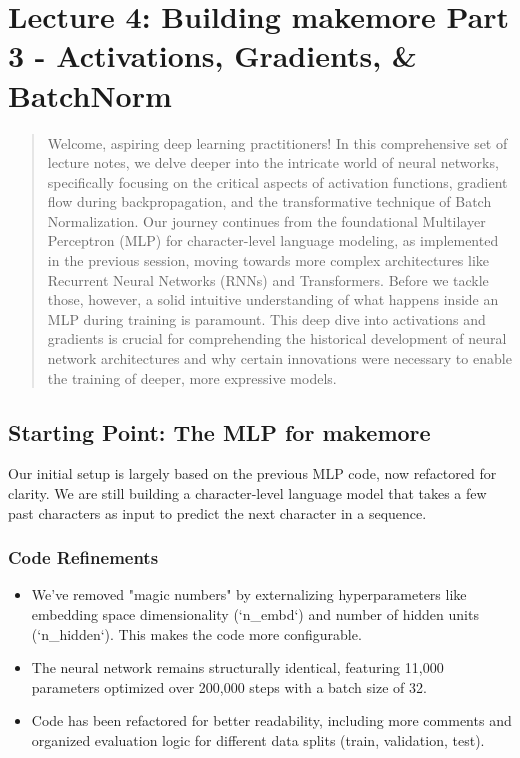 
\section{Lecture 4: Building makemore Part 3 - Activations, Gradients, \& BatchNorm}

\begin{abstract}
Welcome, aspiring deep learning practitioners! In this comprehensive set of lecture notes, we delve deeper into the intricate world of neural networks, specifically focusing on the critical aspects of activation functions, gradient flow during backpropagation, and the transformative technique of Batch Normalization. Our journey continues from the foundational Multilayer Perceptron (MLP) for character-level language modeling, as implemented in the previous session, moving towards more complex architectures like Recurrent Neural Networks (RNNs) and Transformers. Before we tackle those, however, a solid intuitive understanding of what happens inside an MLP during training is paramount. This deep dive into activations and gradients is crucial for comprehending the historical development of neural network architectures and why certain innovations were necessary to enable the training of deeper, more expressive models.
\end{abstract}

\subsection{Starting Point: The MLP for makemore}

Our initial setup is largely based on the previous MLP code, now refactored for clarity. We are still building a character-level language model that takes a few past characters as input to predict the next character in a sequence.

\subsubsection{Code Refinements}
\begin{itemize}
    \item We've removed "magic numbers" by externalizing hyperparameters like embedding space dimensionality (`n_embd`) and number of hidden units (`n_hidden`). This makes the code more configurable.
    \item The neural network remains structurally identical, featuring 11,000 parameters optimized over 200,000 steps with a batch size of 32.
    \item Code has been refactored for better readability, including more comments and organized evaluation logic for different data splits (train, validation, test).
\end{itemize}

